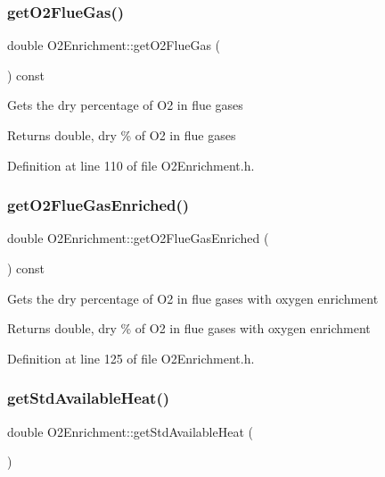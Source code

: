 \subsubsection{\texorpdfstring{get\+O2\+Flue\+Gas()}{getO2FlueGas()}}
{\footnotesize\ttfamily double O2\+Enrichment\+::get\+O2\+Flue\+Gas (\begin{DoxyParamCaption}{ }\end{DoxyParamCaption}) const\hspace{0.3cm}{\ttfamily [inline]}}

Gets the dry percentage of O2 in flue gases \begin{DoxyReturn}{Returns}
double, dry \% of O2 in flue gases 
\end{DoxyReturn}


Definition at line 110 of file O2\+Enrichment.\+h.

\mbox{\label{class_o2_enrichment_a274eddb78560dd502a3c5947ac7e6b96}} 
\subsubsection{\texorpdfstring{get\+O2\+Flue\+Gas\+Enriched()}{getO2FlueGasEnriched()}}
{\footnotesize\ttfamily double O2\+Enrichment\+::get\+O2\+Flue\+Gas\+Enriched (\begin{DoxyParamCaption}{ }\end{DoxyParamCaption}) const\hspace{0.3cm}{\ttfamily [inline]}}

Gets the dry percentage of O2 in flue gases with oxygen enrichment \begin{DoxyReturn}{Returns}
double, dry \% of O2 in flue gases with oxygen enrichment 
\end{DoxyReturn}


Definition at line 125 of file O2\+Enrichment.\+h.

\mbox{\label{class_o2_enrichment_a6eab50d08baaca010d208139cb99d239}} 
\subsubsection{\texorpdfstring{get\+Std\+Available\+Heat()}{getStdAvailableHeat()}}
{\footnotesize\ttfamily double O2\+Enrichment\+::get\+Std\+Available\+Heat (\begin{DoxyParamCaption}{ }\end{DoxyParamCaption})\hspace{0.3cm}{\ttfamily [inline]}}

